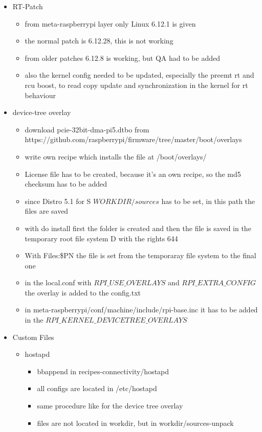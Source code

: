 \begin{itemize}
\begin{itemize}
    \end{itemize}
    \item RT-Patch \begin{itemize}
        \item from meta-raspberrypi layer only Linux 6.12.1 is given
        \item the normal patch is 6.12.28, this is not working
        \item from older patches 6.12.8 is working, but QA had to be added
        \item also the kernel config needed to be updated, especially the preemt rt and rcu boost, to read copy update and synchronization in the kernel for rt behaviour
    \end{itemize}
    \item device-tree overlay \begin{itemize}
        \item download pcie-32bit-dma-pi5.dtbo from https://github.com/raspberrypi/firmware/tree/master/boot/overlays
        \item write own recipe which installs the file at /boot/overlays/
        \item License file has to be created, because it's an own recipe, so the md5 checksum has to be added
        \item since Distro 5.1 for S ${WORKDIR}/sources$ has to be set, in this path the files are saved
        \item with do install first the folder is created and then the file is saved in the temporary root file system D with the rights 644
        \item With Files:\${PN} the file is set from the temporaray file system to the final one 
        \item in the local.conf with $RPI\_USE\_OVERLAYS$ and $RPI\_EXTRA\_CONFIG$ the overlay is added to the config.txt
        \item in meta-raspberrypi/conf/machine/include/rpi-base.inc it has to be added in the $RPI\_KERNEL\_DEVICETREE\_OVERLAYS$ 
    \end{itemize}
    \item Custom Files \begin{itemize}
        \item hostapd \begin{itemize}
            \item bbappend in recipes-connectivity/hostapd
            \item all configs are located in /etc/hostapd
            \item same procedure like for the device tree overlay
            \item files are not located in workdir, but in workdir/sources-unpack
        \end{itemize}
    \end{itemize}  
\end{itemize}